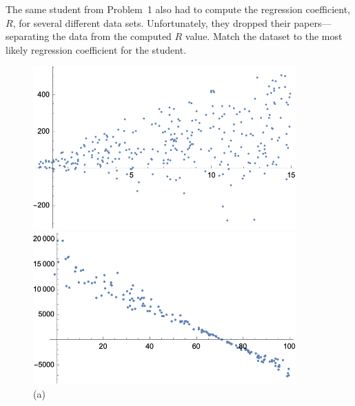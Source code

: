 \documentclass[12pt,letterpaper]{exam}
\begin{document}
\begin{questions}



\newpage
\question[8] The same student from Problem~1 also had to compute the regression coefficient, $R$, for several different data sets. Unfortunately, they dropped their papers---separating the data from the computed $R$ value. Match the dataset to the most likely regression coefficient for the student. \pspace
	\begin{figure}[!ht]
	\centering
	\begin{minipage}{0.45\textwidth}
	   \centering
	   \includegraphics[width=0.9\textwidth]{reg1.png}
	   \caption*{(a)}
	\end{minipage}\hfill
	\begin{minipage}{0.45\textwidth}
	   \centering
	   \includegraphics[width=0.9\textwidth]{reg2.png}

\end{minipage}
\end{figure}
\end{questions}
\end{document}
